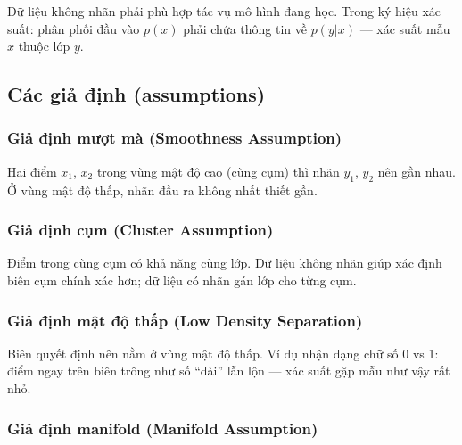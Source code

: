 \begin{luuy}[title={Dữ liệu không nhãn phải liên quan}]
Dữ liệu không nhãn phải phù hợp tác vụ mô hình đang học.
Trong ký hiệu xác suất: phân phối đầu vào $p(x)$ phải chứa thông tin về $p(y|x)$ --- xác suất mẫu $x$ thuộc lớp $y$.
\end{luuy}

\subsection{Các giả định (assumptions)}

\subsubsection{Giả định mượt mà (Smoothness Assumption)}

\begin{ynghia}[title={Smoothness Assumption}]
Hai điểm $x_1$, $x_2$ trong vùng mật độ cao (cùng cụm) thì nhãn $y_1$, $y_2$ nên gần nhau.
Ở vùng mật độ thấp, nhãn đầu ra không nhất thiết gần.
\end{ynghia}

\subsubsection{Giả định cụm (Cluster Assumption)}

\begin{ynghia}[title={Cluster Assumption}]
Điểm trong cùng cụm có khả năng cùng lớp.
Dữ liệu không nhãn giúp xác định biên cụm chính xác hơn; dữ liệu có nhãn gán lớp cho từng cụm.
\end{ynghia}

\subsubsection{Giả định mật độ thấp (Low Density Separation)}

\begin{ynghia}[title={Low Density Separation}]
Biên quyết định nên nằm ở vùng mật độ thấp.
Ví dụ nhận dạng chữ số 0 vs 1: điểm ngay trên biên trông như số ``dài'' lẫn lộn --- xác suất gặp mẫu như vậy rất nhỏ.
\end{ynghia}

\subsubsection{Giả định manifold (Manifold Assumption)}


